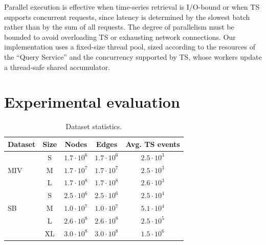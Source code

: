 Parallel execution is effective when time-series retrieval is I/O-bound or when TS supports concurrent requests, since latency is determined by the slowest batch rather than by the sum of all requests.
The degree of parallelism must be bounded to avoid overloading TS or exhausting network connections.
Our implementation uses a fixed-size thread pool, sized according to the resources of the ``Query Service'' and the concurrency supported by TS, whose workers update a thread-safe shared accumulator.

\section{Experimental evaluation}\label{sec:exp}

\begin{table}[t]
\centering
\footnotesize
\caption{Dataset statistics.}
\label{tab:datasets}
\begin{tabular}{lcccc}
\toprule
Dataset       & Size & Nodes & Edges & Avg.
TS events\\
\midrule
\multirow{3}{*}{\textsf{MIV}} & S    & $1.7 \cdot 10^6$   & $1.7 \cdot 10^6$ & $2.5 \cdot 10^3$ \\
              & M    & $1.7 \cdot 10^7$   & $1.7 \cdot 10^7$ & $2.5 \cdot 10^3$ \\
              & L    & $1.7 \cdot 10^8$   & $1.7 \cdot 10^8$ & $2.6\cdot10^3$ \\\midrule
\multirow{3}{*}{\textsf{SB}}  
              & S    & $2.5\cdot10^{6}$   & $2.5\cdot10^{6}$ & $2.5\cdot10^{4}$ \\
              & M    & $1.0\cdot10^{7}$   & $1.0\cdot10^{7}$ & $5.1\cdot10^{4}$ \\
              & L    & $2.6\cdot10^{8}$   & $2.6\cdot10^{8}$ & $2.5\cdot10^{5}$ \\
              & XL   & $3.0\cdot10^{8}$   & $3.0\cdot10^{8}$ & $1.5\cdot10^{6}$ \\
\bottomrule
\end{tabular}


\end{table}
